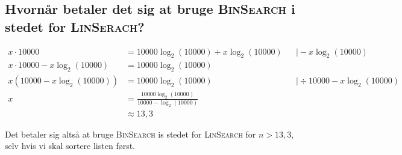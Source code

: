 \subsection{Hvornår betaler det sig at bruge \textsc{BinSearch} i stedet for \textsc{LinSerach}?}
\label{subsec:hvornar-betaler-det-sig-at-bruge-binsearch-i-stedet-for-linserach}

\begin{equation}
    \begin{aligned}
        x \cdot 10000 & = 10000 \log_{2}(10000) + x \log_{2}(10000) && \mid - x \log_{2}(10000) \\
        x \cdot 10000 - x \log_{2}(10000) & = 10000 \log_{2}(10000) \\
        x (10000 - x \log_{2}(10000)) & = 10000 \log_{2}(10000) && \mid \div 10000 - x \log_{2}(10000) \\
        x & = \frac{10000 \log_{2}(10000)}{10000 - \log_{2}(10000)} \\
        & \approx 13,3
    \end{aligned}
    \label{eq:equation15}
\end{equation}

Det betaler sig altså at bruge \textsc{BinSearch} is stedet for \textsc{LinSearch} for \(n > 13,3\), selv hvis vi skal
sortere listen først.
